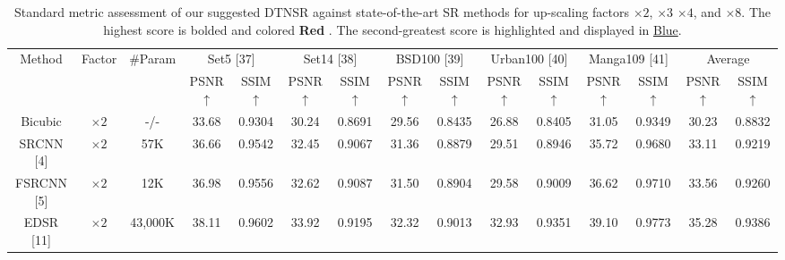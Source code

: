 \documentclass[journal]{IEEEtran}
\begin{document}
\begin{table}
\caption{Standard metric assessment of our suggested DTNSR against state-of-the-art SR methods for up-scaling factors $\times 2$, $\times 3$ $\times 4$, and $\times 8$. The highest score is bolded and colored {\color{red}\textbf{Red }}. The second-greatest score is highlighted and displayed in {\color{blue}\underline{Blue}}.}

\label{table2}
\setlength{\tabcolsep}{4.5 pt}
\begin{tabular}{|c|c|c|cc|cc|cc|cc|cc|cc|}
\hline
\multirow{2}{*}{Method} & \multirow{2}{*}{Factor} & \multirow{2}{*}{\#Param}& \multicolumn{2}{c|}{Set5 [37]}& \multicolumn{2}{c|}{Set14 [38]}& \multicolumn{2}{c|}{BSD100 [39]}& \multicolumn{2}{c|}{Urban100 [40]}& \multicolumn{2}{c|}{Manga109 [41]}& \multicolumn{2}{c|}{Average}\\


 \cline{4-15}&&& \multicolumn{1}{c|}{PSNR$\uparrow$}  & SSIM{$\uparrow$}   & \multicolumn{1}{c|}{PSNR$\uparrow$}  & SSIM {$\uparrow$}   & \multicolumn{1}{c|}{PSNR$\uparrow$}  & SSIM {$\uparrow$}   & \multicolumn{1}{c|}{PSNR$\uparrow$}  & SSIM {$\uparrow$}  & \multicolumn{1}{c|}{PSNR$\uparrow$}  & SSIM {$\uparrow$}   & \multicolumn{1}{c|}{PSNR$\uparrow$}  & SSIM {$\uparrow$}  \\
 \hline

Bicubic&$\times2$ & -/-& \multicolumn{1}{c|}{33.68 } & 0.9304  & \multicolumn{1}{c|}{30.24 } &0.8691  & \multicolumn{1}{c|}{29.56 } & 0.8435  & \multicolumn{1}{c|}{26.88 } & 0.8405  & \multicolumn{1}{c|}{31.05 } & 0.9349&
\multicolumn{1}{c|}{30.23} & 0.8832 \\

SRCNN [4] & $\times 2$ & 57K& \multicolumn{1}{c|}{36.66 } & 0.9542  & \multicolumn{1}{c|}{32.45 } & 0.9067  &\multicolumn{1}{c|}{31.36 } & 0.8879  & \multicolumn{1}{c|}{29.51 } &0.8946 & \multicolumn{1}{c|}{35.72} &0.9680
&\multicolumn{1}{c|}{33.11} & 0.9219\\

FSRCNN [5]& $\times 2$& 12K & \multicolumn{1}{c|}{36.98} &0.9556& \multicolumn{1}{c|}{32.62} & 0.9087 &\multicolumn{1}{c|}{31.50} &0.8904& \multicolumn{1}{c|}{29.58} &0.9009& \multicolumn{1}{c|}{36.62} &0.9710
&\multicolumn{1}{c|}{33.56} & 0.9260\\

EDSR [11] & $\times 2$&43,000K& \multicolumn{1}{c|}{38.11} & 0.9602 & \multicolumn{1}{c|}{33.92} & 0.9195  &\multicolumn{1}{c|}{32.32} & 0.9013 & \multicolumn{1}{c|}{32.93} & 0.9351  & \multicolumn{1}{c|}{39.10} & 0.9773
&\multicolumn{1}{c|}{35.28} &0.9386\\


\end{tabular}
\end{table}
\end{document}
